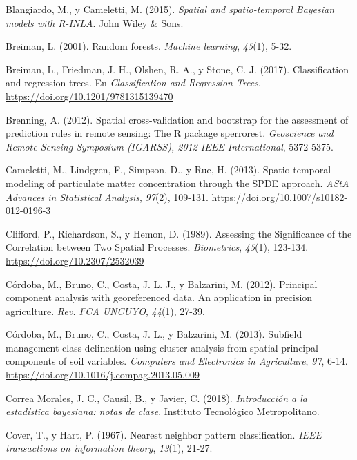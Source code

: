 \documentclass[11pt,b5paper,]{krantz}
\begin{document}
\hypertarget{ref-Blangiardo_Cameletti_2015}{}
Blangiardo, M., y Cameletti, M. (2015). \emph{Spatial and
spatio-temporal Bayesian models with R-INLA}. John Wiley \& Sons.

\hypertarget{ref-Breiman_2001}{}
Breiman, L. (2001). Random forests. \emph{Machine learning},
\emph{45}(1), 5-32.

\hypertarget{ref-Breiman_Friedman_Olshen_Stone_2017}{}
Breiman, L., Friedman, J. H., Olshen, R. A., y Stone, C. J. (2017).
Classification and regression trees. En \emph{Classification and
Regression Trees}. \url{https://doi.org/10.1201/9781315139470}

\hypertarget{ref-Brenning_2012}{}
Brenning, A. (2012). Spatial cross-validation and bootstrap for the
assessment of prediction rules in remote sensing: The R package
sperrorest. \emph{Geoscience and Remote Sensing Symposium (IGARSS), 2012
IEEE International}, 5372-5375.

\hypertarget{ref-Cameletti_Lindgren_Simpson_Rue_2013}{}
Cameletti, M., Lindgren, F., Simpson, D., y Rue, H. (2013).
Spatio-temporal modeling of particulate matter concentration through the
SPDE approach. \emph{AStA Advances in Statistical Analysis},
\emph{97}(2), 109-131. \url{https://doi.org/10.1007/s10182-012-0196-3}

\hypertarget{ref-Clifford_Richardson_Hemon_1989}{}
Clifford, P., Richardson, S., y Hemon, D. (1989). Assessing the
Significance of the Correlation between Two Spatial Processes.
\emph{Biometrics}, \emph{45}(1), 123-134.
\url{https://doi.org/10.2307/2532039}

\hypertarget{ref-Cuxf3rdoba_Balzarini_Bruno_Costa_Balzarini_Costa_2012}{}
Córdoba, M., Bruno, C., Costa, J. L. J., y Balzarini, M. (2012).
Principal component analysis with georeferenced data. An application in
precision agriculture. \emph{Rev. FCA UNCUYO}, \emph{44}(1), 27-39.

\hypertarget{ref-Cordoba2013}{}
Córdoba, M., Bruno, C., Costa, J. L., y Balzarini, M. (2013). Subfield
management class delineation using cluster analysis from spatial
principal components of soil variables. \emph{Computers and Electronics
in Agriculture}, \emph{97}, 6-14.
\url{https://doi.org/10.1016/j.compag.2013.05.009}

\hypertarget{ref-Correa_Morales_Causil_Javier_2018}{}
Correa Morales, J. C., Causil, B., y Javier, C. (2018).
\emph{Introducción a la estadística bayesiana: notas de clase}.
Instituto Tecnológico Metropolitano.

\hypertarget{ref-Cover_Hart_1967}{}
Cover, T., y Hart, P. (1967). Nearest neighbor pattern classification.
\emph{IEEE transactions on information theory}, \emph{13}(1), 21-27.
\end{document}
